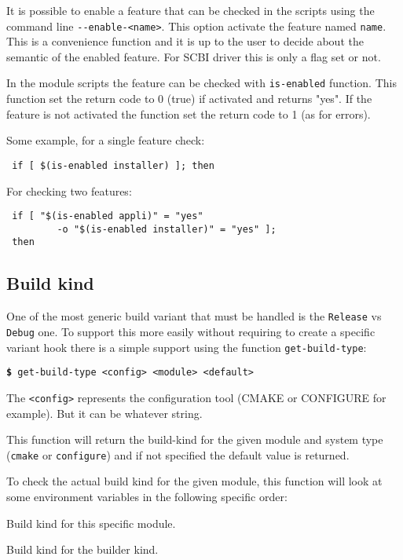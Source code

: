\documentclass[a4paper,12pt,twoside]{article}
\newcommand{\code}[1]{\texttt{#1}}
\newcommand{\cmd}[1]{\tabto{1cm}\hspace{0.5cm}\texttt{\textbf{\$} #1}}
\newcommand{\ddash}{-{}-}
\begin{document}
It is possible to enable a feature that can be checked in the scripts using the command line \code{\ddash{}enable-<name>}. This option activate the feature named \code{name}. This is a convenience function and it is up to the user to decide about the semantic of the enabled feature. For SCBI driver this is only a flag set or not.

In the module scripts the feature can be checked with \code{is-enabled} function. This function set the return code to 0 (true) if activated and returns "yes". If the feature is not activated the function set the return code to 1 (as for errors).

Some example, for a single feature check:

\begin{lstlisting}
 if [ $(is-enabled installer) ]; then
\end{lstlisting}

For checking two features:

\begin{lstlisting}
 if [ "$(is-enabled appli)" = "yes"
         -o "$(is-enabled installer)" = "yes" ];
 then
\end{lstlisting}

\subsection{Build kind}

One of the most generic build variant that must be handled is the \code{Release} vs \code{Debug} one. To support this more easily without requiring to create a specific variant hook there is a simple support using the function \code{get-build-type}:

\cmd{get-build-type <config> <module> <default>}

The \code{<config>} represents the configuration tool (CMAKE or CONFIGURE for example). But it can be whatever string.

This function will return the build-kind for the given module and system type (\code{cmake} or \code{configure}) and if not specified the default value is returned.

To check the actual build kind for the given module, this function will look at some environment variables in the following specific order:

\begin{description}[style=nextline]
	\item [SCBI\_<module>\_BUILD\_TYPE] Build kind for this specific module.
	\item [SCBI\_<CONFIG>\_BUILD\_TYPE] Build kind for the builder kind.
\end{description}
\end{document}
